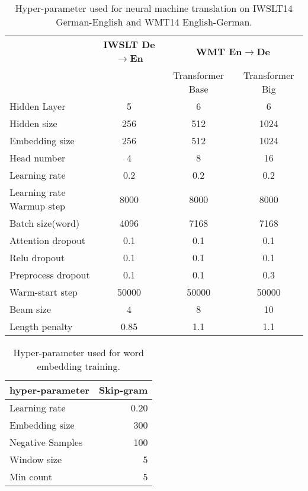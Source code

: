 \documentclass{article}
\begin{document}
\begin{table}[!htbp]
\begin{center}
		\begin{tabular}{l|c||cc}
			\toprule
			& \bf IWSLT De$\to$En & \multicolumn{2}{c}{\bf WMT En$\to$De}\\
            & & \small Transformer Base & \small Transformer Big\\
            \hline
			Hidden Layer & 5 & 6 & 6\\
            Hidden size & 256 & 512 & 1024\\
            Embedding size & 256 & 512 & 1024\\
            Head number & 4 & 8 & 16\\
            Learning rate & 0.2 & 0.2 & 0.2\\
            Learning rate Warmup step & 8000 & 8000 & 8000\\
            Batch size(word) & 4096 & 7168 & 7168\\
            \hline
            Attention dropout & 0.1 & 0.1 & 0.1\\
            Relu dropout & 0.1 & 0.1 & 0.1\\
            Preprocess dropout & 0.1 & 0.1 & 0.3\\
            \hline
            Warm-start step & 50000 & 50000 & 50000 \\
            \hline
            Beam size &4 & 8& 10\\
            \hline
            Length penalty & 0.85 & 1.1& 1.1\\
            \bottomrule
		\end{tabular}
	\end{center}
	\caption{\label{mt-hyper-table} Hyper-parameter used for neural machine translation on IWSLT14 German-English and WMT14 English-German.}
\end{table}

\begin{table}[!htbp]
\begin{center}
		\begin{tabular}{l|r}
			\toprule
			\bf hyper-parameter & \bf Skip-gram \\
            \hline
            Learning rate & 0.20 \\
            Embedding size & 300 \\
            Negative Samples & 100 \\
            Window size & 5 \\
            Min count & 5 \\
            \bottomrule
		\end{tabular}
	\end{center}
	\caption{\label{embedding-hyper-table} Hyper-parameter used for word embedding training. }
\end{table}
\end{document}
